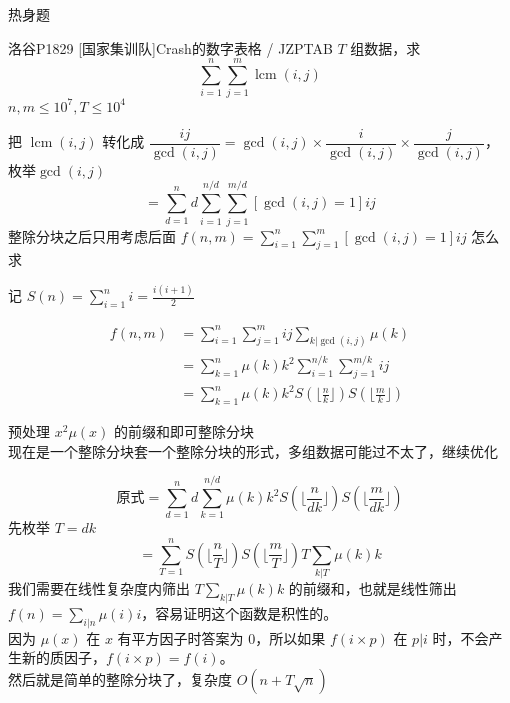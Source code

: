 \documentclass[UTF8]{beamer}
\begin{document}
    \begin{frame}{热身题}
            \begin{block}{洛谷P1829 [国家集训队]Crash的数字表格 / JZPTAB}
                $T$ 组数据，求
                $$
                \sum_{i=1}^n\sum_{j=1}^m\operatorname{lcm}(i,j)
                $$
                $n,m\le 10^7,T\le 10^4$
            \end{block}
            \pause
            把 $\operatorname{lcm}(i,j)$ 转化成 $\dfrac{ij}{\gcd(i,j)}=\gcd(i,j)\times \dfrac{i}{\gcd(i,j)}\times \dfrac{j}{\gcd(i,j)}$，枚举$\gcd(i,j)$\\
            $$ 
            =\sum_{d=1}^nd\sum_{i=1}^{n/d}\sum_{j=1}^{m/d}[\gcd(i,j)=1]ij
            $$
            整除分块之后只用考虑后面 $f(n,m)=\sum_{i=1}^n\sum_{j=1}^m[\gcd(i,j)=1]ij$ 怎么求
    \end{frame}
    \begin{frame}
        记 $S(n)=\sum_{i=1}^n i=\frac{i(i+1)}{2}$
        \begin{footnotesize}
        $$
        \begin{aligned}
            f(n,m)&=\sum_{i=1}^n\sum_{j=1}^mij\sum_{k|\gcd(i,j)}\mu(k)\\
            &=\sum_{k=1}^n\mu(k)k^2\sum_{i=1}^{n/k}\sum_{j=1}^{m/k}ij\\
            &=\sum_{k=1}^n\mu(k)k^2S(\lfloor\frac{n}{k}\rfloor)S(\lfloor\frac{m}{k}\rfloor) 
        \end{aligned}
        $$
        \end{footnotesize}
        预处理 $x^2\mu (x)$ 的前缀和即可整除分块\\
        现在是一个整除分块套一个整除分块的形式，多组数据可能过不太了，继续优化
    \end{frame}
    \begin{frame}
        $$
        \text{原式}=\sum_{d=1}^nd\sum_{k=1}^{n/d}\mu(k)k^2S(\lfloor\frac{n}{dk}\rfloor)S(\lfloor\frac{m}{dk}\rfloor)
        $$
        先枚举 $T=dk$
        $$
        =\sum_{T=1}^nS(\lfloor\frac{n}{T}\rfloor)S(\lfloor\frac{m}{T}\rfloor)T\sum_{k|T}\mu(k)k
        $$
        \pause
        我们需要在线性复杂度内筛出 $T\sum_{k|T}\mu(k)k$ 的前缀和，也就是线性筛出 $f(n)=\sum_{i|n}\mu(i)i$，容易证明这个函数是积性的。\\
        $\ $\\
        因为 $\mu(x)$ 在 $x$ 有平方因子时答案为 $0$，所以如果 $f(i\times p)$ 在 $p|i$ 时，不会产生新的质因子，$f(i\times p)=f(i)$。\\
        $\ $\\
        然后就是简单的整除分块了，复杂度 $O(n+T\sqrt{n})$
    \end{frame}
    
\end{document}
